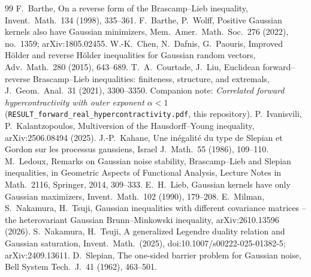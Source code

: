 \documentclass[11pt]{amsart}
\theoremstyle{definition}
\begin{document}
\begin{thebibliography}{99}
 F.~Barthe, On a reverse form of the Brascamp--Lieb inequality, Invent.\ Math.\ 134 (1998), 335--361.
 F.~Barthe, P.~Wolff, Positive Gaussian kernels also have Gaussian minimizers, Mem.\ Amer.\ Math.\
Soc.\ 276 (2022), no.~1359; arXiv:1805.02455.
 W.-K.~Chen, N.~Dafnis, G.~Paouris, Improved H\"older and reverse H\"older inequalities for
Gaussian random vectors, Adv.\ Math.\ 280 (2015), 643--689.
 T.~A.~Courtade, J.~Liu, Euclidean forward--reverse Brascamp--Lieb inequalities: finiteness, structure,
and extremals, J.\ Geom.\ Anal.\ 31 (2021), 3300--3350.
 Companion note: \emph{Correlated forward hypercontractivity with outer exponent $\alpha<1$}
(\texttt{RESULT\_forward\_real\_hypercontractivity.pdf}, this repository).
\bibitem{IK25} P.~Ivanisvili, P.~Kalantzopoulos, Multiversion of the Hausdorff--Young inequality,
arXiv:2506.08494 (2025).
 J.-P.~Kahane, Une in\'egalit\'e du type de Slepian et Gordon sur les processus gaussiens, Israel J.\
Math.\ 55 (1986), 109--110.
\bibitem{Ledoux14} M.~Ledoux, Remarks on Gaussian noise stability, Brascamp--Lieb and Slepian inequalities, in
Geometric Aspects of Functional Analysis, Lecture Notes in Math.\ 2116, Springer, 2014, 309--333.
\bibitem{Lieb90} E.~H.~Lieb, Gaussian kernels have only Gaussian maximizers, Invent.\ Math.\ 102 (1990),
179--208.
\bibitem{MNT26} E.~Milman, S.~Nakamura, H.~Tsuji, Gaussian inequalities with different covariance matrices -- the
heterovariant Gaussian Brunn--Minkowski inequality, arXiv:2610.13596 (2026).
\bibitem{NT25} S.~Nakamura, H.~Tsuji, A generalized Legendre duality relation and Gaussian saturation, Invent.\
Math.\ (2025), doi:10.1007/s00222-025-01382-5; arXiv:2409.13611.
\bibitem{Sle62} D.~Slepian, The one-sided barrier problem for Gaussian noise, Bell System Tech.\ J.\ 41 (1962),
463--501.
\end{thebibliography}
\end{document}
